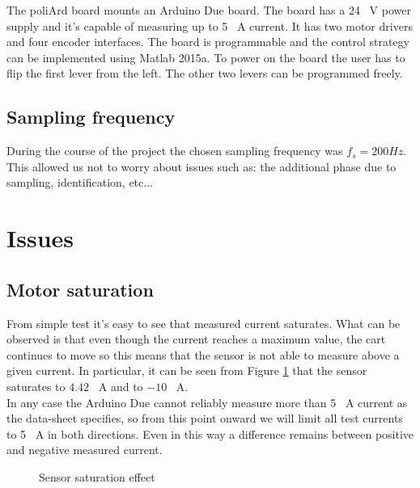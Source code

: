 The poliArd board mounts an Arduino Due board. The board has a 24 \SI{}{\volt} power supply and it’s capable of measuring up to 5 \SI{}{\ampere} current. It has two motor drivers and four encoder interfaces. The board is programmable and the control strategy can be implemented using Matlab 2015a. To power on the board the user has to flip the first lever from the left. The other two levers can be programmed freely.
\subsection{Sampling frequency}
During the course of the project the chosen sampling frequency was $f_s = 200 Hz$.  This allowed us not to worry about issues such as: the additional phase due to sampling, identification, etc...
\section{Issues}
\subsection{Motor saturation}
From simple test it’s easy to see that measured current saturates. What can be observed is that even though the current reaches a maximum value, the cart continues to move so this means that the sensor is not able to measure above a given current. In particular, it can be seen from Figure \ref{fig:sensorsaturation} that the sensor saturates to $4.42$ \SI{}{\ampere} and to $-10$ \SI{}{\ampere}.\\
In any case the Arduino Due cannot reliably measure more than 5 \SI{}{\ampere} current as the data-sheet specifies, so from this point onward we will limit all test currents to 5 \SI{}{\ampere} in both directions. Even in this way a difference remains between positive and negative measured current.  
  \begin{figure}[!h]
  	\centering
  	\caption{Sensor saturation effect}
  	\label{fig:sensorsaturation}
  \end{figure}
